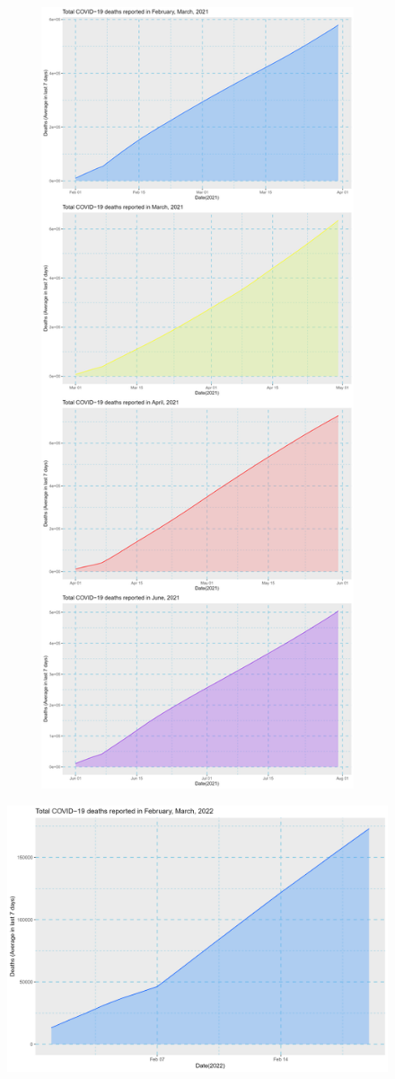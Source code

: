 \documentclass[a4paper]{article}
\theoremstyle{definition}
\begin{document}
\begin{enumerate}[i)]
\begin{enumerate}[1)]
\begin{figure}[H]
				\includegraphics[height=23cm,width=13cm]{images/8.6.2.png}
			\end{figure}
			\begin{figure}[H]
				\centering
				\includegraphics[scale=0.2]{images/8.6.3.png}

\end{figure}
\end{enumerate}
\end{enumerate}
\end{document}
